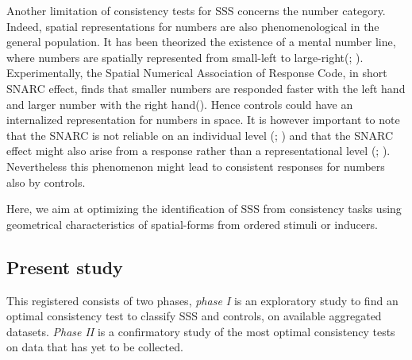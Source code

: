 \documentclass[
  man,
  floatsintext,
  longtable,
  a4paper,
  nolmodern,
  notxfonts,
  notimes,
  colorlinks=true,linkcolor=blue,citecolor=blue,urlcolor=blue]{apa7}
\begin{document}
 Another
limitation of consistency tests for SSS concerns the number category.
Indeed, spatial representations for numbers are also phenomenological in
the general population. It has been theorized the existence of a mental
number line, where numbers are spatially represented from small-left to
large-right(;
). Experimentally, the
Spatial Numerical Association of Response Code, in short SNARC effect,
finds that smaller numbers are responded faster with the left hand and
larger number with the right hand(). Hence controls could have an internalized representation
for numbers in space. It is however important to note that the SNARC is
not reliable on an individual level (; ) and that the
SNARC effect might also arise from a response rather than a
representational level (; ). Nevertheless
this phenomenon might lead to consistent responses for numbers also by
controls.

Here, we aim at optimizing the identification of SSS from consistency
tasks using geometrical characteristics of spatial-forms from ordered
stimuli or inducers.


\subsection{Present study}\label{present-study}


This registered consists of two phases, \emph{phase I} is an exploratory
study to find an optimal consistency test to classify SSS and controls,
on available aggregated datasets. \emph{Phase II} is a confirmatory
study of the most optimal consistency tests on data that has yet to be
collected.
\end{document}
